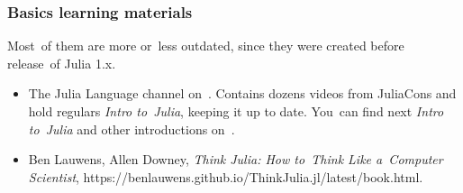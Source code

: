 \documentclass[10pt,t]{beamer}
\begin{document}
\begin{frame}
  \frametitle{Basics learning materials}


  Most~of them are more or~less outdated, since they were created
  before release~of Julia 1.x.
  \begin{itemize}
    \RaggedRight




  \item The Julia Language channel
    on~.
    Contains dozens videos from JuliaCons and hold regulars
    \textit{Intro to~Julia}, keeping it up to date. You~can find next
    \textit{Intro to~Julia} and other introductions
    on~.

  \item Ben Lauwens, Allen Downey, \textit{Think Julia: How to~Think
      Like a~Computer Scientist},
    {https://benlauwens.github.io/ThinkJulia.jl/latest/book.html}.

  \end{itemize}

\end{frame}
\end{document}
